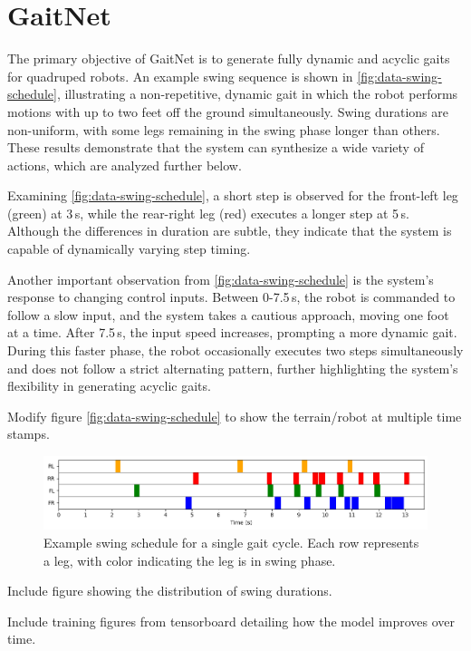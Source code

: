 \section{GaitNet}
\label{sec:results-gaitnet}

The primary objective of GaitNet is to generate fully dynamic and
acyclic gaits for quadruped robots. An example swing sequence is
shown in \autoref{fig:data-swing-schedule}, illustrating a
non-repetitive, dynamic gait in which the robot performs motions with
up to two feet off the ground simultaneously. Swing durations are
non-uniform, with some legs remaining in the swing phase longer than
others. These results demonstrate that the system can synthesize a
wide variety of actions, which are analyzed further below.

Examining \autoref{fig:data-swing-schedule}, a short step is observed
for the front-left leg (green) at 3\,s, while the rear-right leg
(red) executes a longer step at 5\,s. Although the differences in
duration are subtle, they indicate that the system is capable of
dynamically varying step timing.

Another important observation from \autoref{fig:data-swing-schedule}
is the system's response to changing control inputs. Between
0-7.5\,s, the robot is commanded to follow a slow input, and the
system takes a cautious approach, moving one foot at a time. After
7.5\,s, the input speed increases, prompting a more dynamic gait.
During this faster phase, the robot occasionally executes two steps
simultaneously and does not follow a strict alternating pattern,
further highlighting the system's flexibility in generating acyclic gaits.

\begin{todo}
  Modify figure \autoref{fig:data-swing-schedule} to show   the
  terrain/robot at multiple time stamps.
\end{todo}

\begin{figure}[H]
  \centering
  \includegraphics[width=\textwidth]{images/data/swing-schedule.png}
  \caption{Example swing schedule for a single gait cycle. Each row
  represents a leg, with color indicating the leg is in swing phase.}
  \label{fig:data-swing-schedule}
\end{figure}

\begin{todo}
  Include figure showing the distribution of swing durations.
\end{todo}

\begin{todo}
  Include training figures from tensorboard detailing how the model
  improves over time.
\end{todo}
